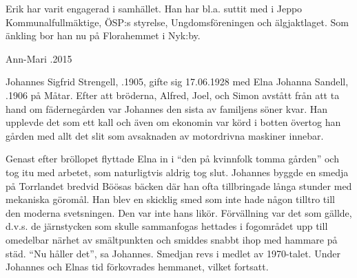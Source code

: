 Erik har varit engagerad i samhället. Han har bl.a. suttit med i Jeppo Kommunalfullmäktige, ÖSP:s styrelse, Ungdomsföreningen och älgjaktlaget. Som änkling bor han nu på Florahemmet i Nyk:by.
\begin{jhchildren}
  \item {}
  \item {}
  \item {}
  \item {}
\end{jhchildren}

Ann-Mari .2015


Johannes Sigfrid Strengell, .1905, gifte sig 17.06.1928 med Elna Johanna Sandell, .1906 på Måtar. Efter att bröderna, Alfred, Joel, och Simon avstått från att ta hand om fädernegården var Johannes den sista av familjens söner kvar. Han upplevde det som ett kall och även om ekonomin var körd i botten övertog han gården med allt det slit som avsaknaden av motordrivna maskiner innebar.

Genast efter bröllopet flyttade Elna  in i ``den på kvinnfolk tomma gården'' och tog itu med arbetet, som naturligtvis aldrig tog slut. Johannes byggde en smedja på Torrlandet bredvid Böösas bäcken där han ofta tillbringade långa stunder med mekaniska göromål. Han blev en skicklig smed som inte hade någon tilltro till  den moderna svetsningen. Den var inte hans likör. Förvällning var det som gällde, d.v.s. de järnstycken som skulle sammanfogas hettades i fogområdet upp till omedelbar närhet av smältpunkten och smiddes snabbt ihop med hammare på städ. ``Nu håller det'', sa Johannes. Smedjan revs i medlet av 1970-talet. Under Johannes och Elnas tid förkovrades hemmanet, vilket fortsatt.
\begin{jhchildren}
  \item {}
  \item {}
  \item {}
  \item {}
\end{jhchildren}

